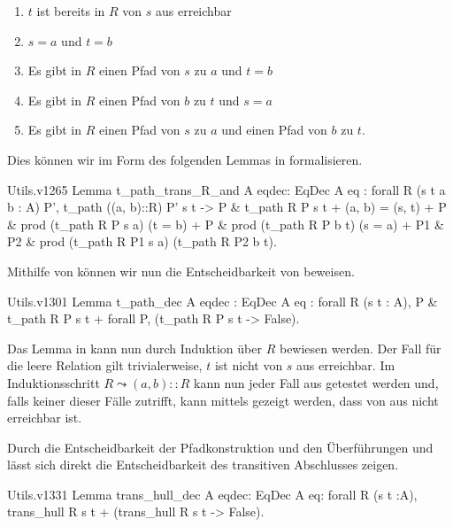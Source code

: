 \begin{enumerate}[label=(\alph*)]
    \item $t$ ist bereits in $R$ von $s$ aus erreichbar
    \item $s=a$ und $t=b$
    \item Es gibt in $R$ einen Pfad von $s$ zu $a$ und $t=b$
    \item Es gibt in $R$ einen Pfad von $b$ zu $t$ und $s=a$
    \item Es gibt in $R$ einen Pfad von $s$ zu $a$ und einen Pfad von $b$ zu $t$.
\end{enumerate}

Dies können wir im Form des folgenden Lemmas in  formalisieren.

\begin{code}{Utils.v}{}{1265}
Lemma t_path_trans_R_and {A} {eqdec: EqDec A eq} : 
    forall R (s t a b : A) P',
      t_path ((a, b)::R) P' s t ->
        {P & t_path R P s t} + 
        {(a, b) = (s, t)} +
        {P & prod (t_path R P s a) (t = b)} +
        {P & prod (t_path R P b t) (s = a)} +
        {P1 & {P2 & prod (t_path R P1 s a) (t_path R P2 b t)}}.
\end{code}

Mithilfe von  können wir nun die Entscheidbarkeit von  beweisen.

\begin{code}{Utils.v}{}{1301}
Lemma t_path_dec {A} {eqdec : EqDec A eq} : forall R (s t : A), 
    {P & t_path R P s t} + {forall P, (t_path R P s t -> False)}.
\end{code}
Das Lemma in  kann nun durch Induktion über $R$ bewiesen werden. Der Fall für die leere Relation gilt trivialerweise, $t$ ist nicht von $s$ aus erreichbar. Im Induktionsschritt $R \leadsto (a,b)::R$ kann nun jeder Fall aus  getestet werden und, falls keiner dieser Fälle zutrifft, kann mittels  gezeigt werden, dass  von  aus nicht erreichbar ist.

Durch die Entscheidbarkeit der Pfadkonstruktion und den Überführungen  und  lässt sich direkt die Entscheidbarkeit des transitiven Abschlusses zeigen.

\begin{code}{Utils.v}{}{1331}
Lemma trans_hull_dec {A} {eqdec: EqDec A eq}: forall R (s t :A), 
    trans_hull R s t + (trans_hull R s t -> False).
\end{code}

